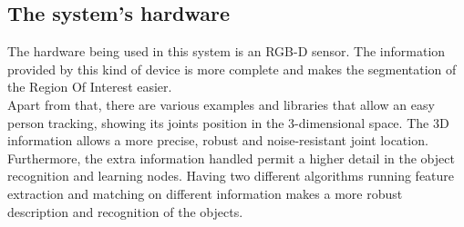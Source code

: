 \subsection{The system's hardware}

The hardware being used in this system is an RGB-D sensor. The information provided by this kind of device is more complete and makes the segmentation of the Region Of Interest easier. 
\\

Apart from that, there are various examples and libraries that allow an easy person tracking, showing its joints position in the 3-dimensional space. The 3D information allows a more precise, robust and noise-resistant joint location.
\\

Furthermore, the extra information handled permit a higher detail in the object recognition and learning nodes. Having two different algorithms running feature extraction and matching on different information makes a more robust description and recognition of the objects. 

